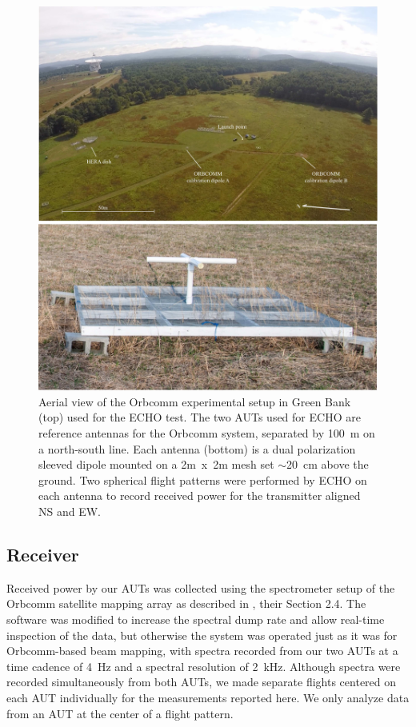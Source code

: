 \documentclass[preprint2,numberedappendix,tighten,twocolappendix]{aastex6}
\begin{document}
\begin{figure}
\begin{center}
\includegraphics[width=\columnwidth]{figures/Green_Bank_aerial_diagram_extended.jpg}
\caption{Aerial view of the Orbcomm experimental setup in Green Bank (top) used for the ECHO test.  The two AUTs used for ECHO are reference antennas for the Orbcomm system, separated by 100~m on a north-south line. Each antenna (bottom) is a dual polarization sleeved dipole mounted on a 2m~x~2m mesh set $\sim$20~cm above the ground.  Two spherical flight patterns were performed by ECHO on each antenna to record received power for the transmitter aligned NS and EW.  }
\label{fig:GB_aerial}
\end{center}
\end{figure}


\subsection{Receiver}

Received power by our AUTs was collected using the spectrometer setup of the Orbcomm satellite mapping array as described in \citet{2016:NebenHERAdish}, their Section 2.4. The software was modified  to increase the spectral dump rate and allow real-time inspection of the data, but otherwise the system was operated just as it was for Orbcomm-based beam mapping, with spectra recorded from our two AUTs at a time cadence of 4~Hz and a spectral resolution of 2~kHz.   Although spectra were recorded simultaneously from both AUTs, we made separate flights centered on each AUT individually for the measurements reported here.  We only analyze data from an AUT at the center of a flight pattern.
\end{document}
